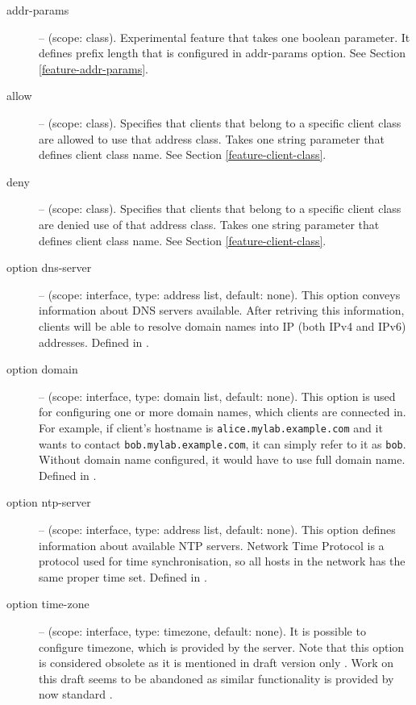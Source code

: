 \begin{description}
\item[addr-params] -- (scope: class). Experimental feature that takes 
  one boolean parameter. It defines prefix length that is configured
  in addr-params option. See Section \ref{feature-addr-params}.

\item[allow] -- (scope: class). Specifies that clients that belong to
  a specific client class are allowed to use that address class. Takes
  one string parameter that defines client class name. See Section
  \ref{feature-client-class}.

\item[deny] -- (scope: class). Specifies that clients that belong to
  a specific client class are denied use of that address class. Takes
  one string parameter that defines client class name. See Section
  \ref{feature-client-class}.

 \item[option dns-server] -- (scope: interface, type: address list, default:
   none). This option conveys information about DNS servers
   available. After retriving this information, clients will be able
   to resolve domain names into IP (both IPv4 and IPv6)
   addresses. Defined in \cite{rfc3596}.

 \item[option domain] -- (scope: interface, type: domain list, default:
   none). This option is used for configuring one or more domain
   names, which clients are connected in. For example, if client's
   hostname is \verb+alice.mylab.example.com+ and it wants to contact
   \verb+bob.mylab.example.com+, it can simply refer to it as
   \verb+bob+. Without domain name configured, it would have to use
   full domain name. Defined in \cite{rfc3596}.

 \item[option ntp-server] -- (scope: interface, type: address list, default:
   none). This option defines information about available NTP
   servers. Network Time Protocol \cite{rfc2030} is a protocol used
   for time synchronisation, so all hosts in the network has the same
   proper time set. Defined in \cite{rfc4075}.

 \item[option time-zone] -- (scope: interface, type: timezone, default:
   none). It is possible to configure timezone, which is provided by
   the server. Note that this option is considered obsolete as it is
   mentioned in draft version only \cite{draft-timezone}. Work on this
   draft seems to be abandoned as similar functionality is provided by
   now standard \cite{rfc4075}.


\end{description}
